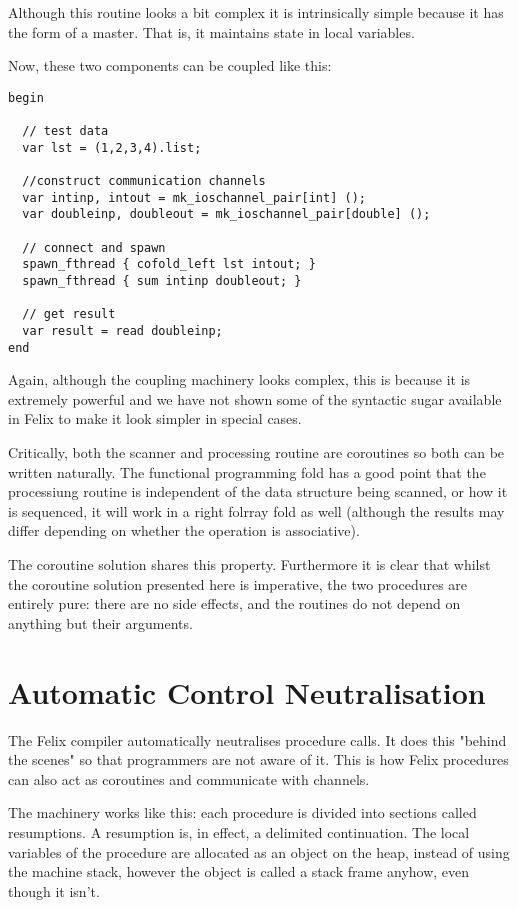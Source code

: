 \documentclass{article}
\begin{document}
Although this routine looks a bit complex it is intrinsically simple
because it has the form of a master. That is, it maintains state
in local variables.

Now, these two components can be coupled like this:

\begin{verbatim}
begin

  // test data
  var lst = (1,2,3,4).list;

  //construct communication channels
  var intinp, intout = mk_ioschannel_pair[int] ();
  var doubleinp, doubleout = mk_ioschannel_pair[double] ();

  // connect and spawn
  spawn_fthread { cofold_left lst intout; }
  spawn_fthread { sum intinp doubleout; }
  
  // get result
  var result = read doubleinp;
end
\end{verbatim}

Again, although the coupling machinery looks complex, this is because
it is extremely powerful and we have not shown some of the syntactic
sugar available in Felix to make it look simpler in special cases.

Critically, both the scanner and processing routine are coroutines
so both can be written naturally. The functional programming fold
has a good point that the processiung routine is independent
of the data structure being scanned, or how it is sequenced,
it will work in a right folrray fold as well (although
the results may differ depending on whether the operation
is associative).

The coroutine solution shares this property. Furthermore it is clear
that whilst the coroutine solution presented here is imperative,
the two procedures are entirely pure: there are no side effects,
and the routines do not depend on anything but their arguments. 

\section{Automatic Control Neutralisation}
The Felix compiler automatically neutralises procedure calls.
It does this "behind the scenes" so that programmers are not
aware of it. This is how Felix procedures can also act as coroutines
and communicate with channels.

The machinery works like this: each procedure is divided into
sections called resumptions. A resumption is, in effect, a
delimited continuation. The local variables of the procedure
are allocated as an object on the heap, instead of using
the machine stack, however the object is called a stack
frame anyhow, even though it isn't.
\end{document}
